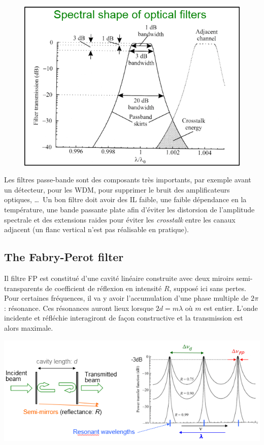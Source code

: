 	\begin{figure}
	\vspace{-5mm}
	\includegraphics[scale=0.3]{ch3/image17}
	\end{figure}
Les filtres passe-bande sont des composants très importants, par exemple avant un détecteur, pour 
les WDM, pour supprimer le bruit des amplificateurs optiques, \dots\ Un bon filtre doit avoir des
IL faible, une faible dépendance en la température, une bande passante plate afin d'éviter les 
distorsion de l'amplitude spectrale et des extensions raides pour éviter les \textit{crosstalk}
entre les canaux adjacent (un flanc vertical n'est pas réalisable en pratique). 

\subsection{The Fabry-Perot filter}
Il filtre FP est constitué d'une cavité linéaire construite avec deux miroirs semi-transparents 
de coefficient de réflexion en intensité $R$, supposé ici sans pertes. Pour certaines fréquences,
il va y avoir l'accumulation d'une phase multiple de $2\pi$ : résonance. Ces résonances auront 
lieux lorsque $2d=m\lambda$ où $m$ est entier. L'onde incidente et réfléchie interagiront de
façon constructive et la transmission est alors maximale.

\begin{center}
	\includegraphics[scale=0.75]{ch3/image18}
\end{center}

